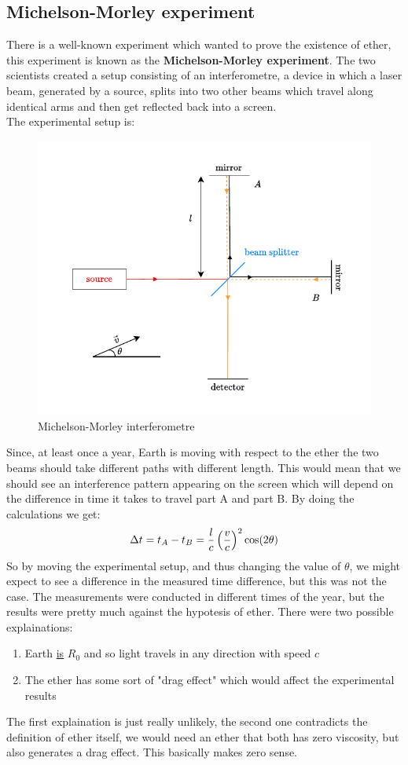 \subsection{Michelson-Morley experiment}
There is a well-known experiment which wanted to prove the existence of ether, this experiment is known as the \textbf{Michelson-Morley experiment}. The two scientists created a setup consisting of an interferometre, a device in which a laser beam, generated by a source, splits into two other beams which travel along identical arms and then get reflected back into a screen.\\
The experimental setup is:
\begin{figure}[H]
  \centering
  \includegraphics[width=0.6\linewidth]{res/svg/michelson_morley_experiment.drawio}
  \caption{Michelson-Morley interferometre}
\end{figure}
Since, at least once a year, Earth is moving with respect to the ether the two beams should take different paths with different length. This would mean that we should see an interference pattern appearing on the screen which will depend on the difference in time it takes to travel part A and part B. By doing the calculations we get:
\begin{equation}
  \Delta t = t_A - t_B = \dfrac{l}{c}\left(\dfrac{v}{c}\right)^2\cos(2\theta)
\end{equation}
So by moving the experimental setup, and thus changing the value of $\theta$, we might expect to see a difference in the measured time difference, but this was not the case. The measurements were conducted in different times of the year, but the results were pretty much against the hypotesis of ether. There were two possible explainations:
\begin{enumerate}
  \item Earth \underline{is} $R_0$ and so light travels in any direction with speed $c$
  \item The ether has some sort of "drag effect" which would affect the experimental results
\end{enumerate}
The first explaination is just really unlikely, the second one contradicts the definition of ether itself, we would need an ether that both has zero viscosity, but also generates a drag effect. This basically makes zero sense.
